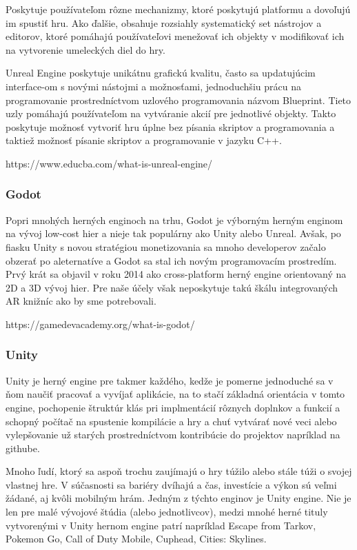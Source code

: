 Poskytuje používateľom rôzne mechanizmy, ktoré poskytujú platformu a dovoľujú im spustiť hru. Ako ďalšie, obsahuje rozsiahly systematický set nástrojov a editorov, ktoré pomáhajú používateľovi menežovať ich objekty v modifikovať ich na vytvorenie umeleckých diel do hry.

Unreal Engine poskytuje unikátnu grafickú kvalitu, často sa updatujúcim interface-om s novými nástojmi a možnosťami, jednoduchšiu prácu na programovanie prostredníctvom uzlového programovania názvom Blueprint. Tieto uzly pomáhajú používateľom na vytváranie akcií pre jednotlivé objekty. Takto poskytuje možnosť vytvoriť hru úplne bez písania skriptov a programovania a taktiež možnosť písanie skriptov a programovanie v jazyku C++.

https://www.educba.com/what-is-unreal-engine/

\subsubsection{Godot}

Popri mnohých herných enginoch na trhu, Godot je výborným herným enginom na vývoj low-cost hier a nieje tak populárny ako Unity alebo Unreal. Avšak, po fiasku Unity s novou stratégiou monetizovania sa mnoho developerov začalo obzerať po aleternatíve a Godot sa stal ich novým programovacím prostredím. Prvý krát sa objavil v roku 2014 ako cross-platform herný engine orientovaný na 2D a 3D vývoj hier. Pre naše účely však neposkytuje takú škálu integrovaných AR knižníc ako by sme potrebovali.

https://gamedevacademy.org/what-is-godot/

\subsubsection{Unity}

Unity je herný engine pre takmer každého, kedže je pomerne jednoduché sa v ňom naučiť pracovať a vyvíjať aplikácie, na to stačí základná orientácia v tomto engine, pochopenie štruktúr klás pri implmentácií rôznych doplnkov a funkcií a schopný počítač na spustenie kompilácie a hry a chuť vytvárať nové veci alebo vylepšovanie už starých prostredníctvom kontribúcie do projektov napríklad na githube.

Mnoho ľudí, ktorý sa aspoň trochu zaujímajú o hry túžilo alebo stále túži o svojej vlastnej hre. V súčasnosti sa bariéry dvíhajú a čas, investície a výkon sú veľmi žádané, aj kvôli mobilným hrám. Jedným z týchto enginov je Unity engine. Nie je len pre malé vývojové štúdia (alebo jednotlivcov), medzi mnohé herné tituly vytvorenými v Unity hernom engine patrí napríklad Escape from Tarkov, Pokemon Go, Call of Duty Mobile, Cuphead, Cities: Skylines.

